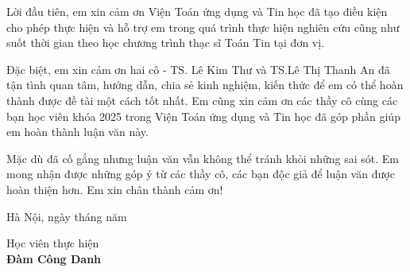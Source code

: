 \quad Lời đầu tiên, em xin cảm ơn Viện Toán ứng dụng và Tin học đã tạo điều kiện cho phép thực hiện và hỗ trợ em trong quá trình thực hiện nghiên cứu cũng như suốt thời gian theo học chương trình thạc sĩ Toán Tin tại đơn vị.
\par
Đặc biệt, em xin cảm ơn hai cô - TS. Lê Kim Thư và TS.Lê Thị Thanh An đã tận tình quan tâm, hướng dẫn, chia sẻ kinh nghiệm, kiến thức để em có thể hoàn thành được đề tài một cách tốt nhất. Em cũng xin cảm ơn các thầy cô cùng các bạn học viên khóa 2025 trong Viện Toán ứng dụng và Tin học đã góp phần giúp em hoàn thành luận văn này.
\par
Mặc dù đã cố gắng nhưng luận văn vẫn không thể tránh khỏi những sai sót. Em mong nhận được những góp ý từ các thầy cô, các bạn độc giả để luận văn được hoàn thiện hơn. Em xin chân thành cảm ơn!
\begin{flushright}
    Hà Nội, ngày tháng năm 
    \textbf{}\\[0.1 cm]
\end{flushright}
\begin{center}
   \hspace{8.8cm}  Học viên thực hiện\\[2 cm]

   \hspace{8.8cm} \bf Đàm Công Danh
\end{center}